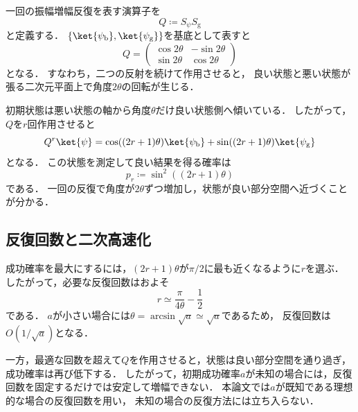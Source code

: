 一回の振幅増幅反復を表す演算子を
\begin{equation}
  Q
  \coloneq
  S_{\psi}S_{\mathrm{g}}
  \label{eq:amplitude-amplification-operator}
\end{equation}
と定義する．
$\{\ket{\psi_{\mathrm{b}}},\ket{\psi_{\mathrm{g}}}\}$を基底として表すと
\begin{equation}
  Q
  =
  \begin{pmatrix}
    \cos 2\theta & -\sin 2\theta\\
    \sin 2\theta & \cos 2\theta
  \end{pmatrix}
  \label{eq:amplitude-amplification-rotation-matrix}
\end{equation}
となる．
すなわち，二つの反射を続けて作用させると，
良い状態と悪い状態が張る二次元平面上で角度$2\theta$の回転が生じる\cite{shimada2020}．

初期状態は悪い状態の軸から角度$\theta$だけ良い状態側へ傾いている．
したがって，$Q$を$r$回作用させると
\begin{equation}
  Q^r\ket{\psi}
  =
  \cos((2r+1)\theta)\ket{\psi_{\mathrm{b}}}
  +\sin((2r+1)\theta)\ket{\psi_{\mathrm{g}}}
  \label{eq:amplitude-after-r-iterations}
\end{equation}
となる．
この状態を測定して良い結果を得る確率は
\begin{equation}
  p_r
  \coloneq
  \sin^2((2r+1)\theta)
  \label{eq:amplified-success-probability}
\end{equation}
である．
一回の反復で角度が$2\theta$ずつ増加し，状態が良い部分空間へ近づくことが分かる．

\subsection{反復回数と二次高速化}
\label{subsec:amplification-iteration-count}

成功確率を最大にするには，$(2r+1)\theta$が$\pi/2$に最も近くなるように$r$を選ぶ．
したがって，必要な反復回数はおよそ
\begin{equation}
  r
  \simeq
  \frac{\pi}{4\theta}-\frac{1}{2}
  \label{eq:near-optimal-amplification-count}
\end{equation}
である．
$a$が小さい場合には$\theta=\arcsin\sqrt{a}\simeq\sqrt{a}$であるため，
反復回数は$O(1/\sqrt{a})$となる．

一方，最適な回数を超えて$Q$を作用させると，状態は良い部分空間を通り過ぎ，
成功確率は再び低下する．
したがって，初期成功確率$a$が未知の場合には，反復回数を固定するだけでは安定して増幅できない．
本論文では$a$が既知である理想的な場合の反復回数を用い，
未知の場合の反復方法には立ち入らない．
